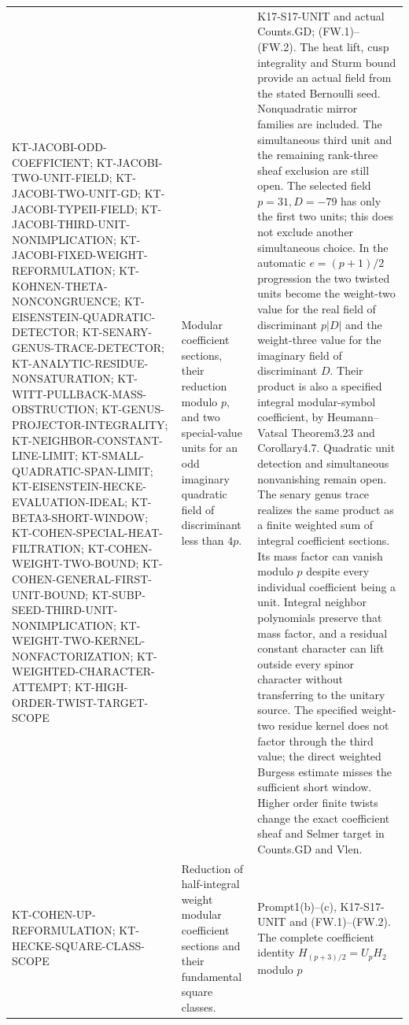\begin{longtable}{>{\raggedright\arraybackslash}p{}
>{\raggedright\arraybackslash}p{}
>{\raggedright\arraybackslash}p{}}
KT-JACOBI-ODD-COEFFICIENT;
KT-JACOBI-TWO-UNIT-FIELD;
KT-JACOBI-TWO-UNIT-GD; KT-JACOBI-TYPEII-FIELD;
KT-JACOBI-THIRD-UNIT-NONIMPLICATION;
KT-JACOBI-FIXED-WEIGHT-REFORMULATION;
KT-KOHNEN-THETA-NONCONGRUENCE;
KT-EISENSTEIN-QUADRATIC-DETECTOR;
KT-SENARY-GENUS-TRACE-DETECTOR;
KT-ANALYTIC-RESIDUE-NONSATURATION;
KT-WITT-PULLBACK-MASS-OBSTRUCTION;
KT-GENUS-PROJECTOR-INTEGRALITY;
KT-NEIGHBOR-CONSTANT-LINE-LIMIT;
KT-SMALL-QUADRATIC-SPAN-LIMIT;
KT-EISENSTEIN-HECKE-EVALUATION-IDEAL;
KT-BETA3-SHORT-WINDOW;
KT-COHEN-SPECIAL-HEAT-FILTRATION;
KT-COHEN-WEIGHT-TWO-BOUND;
KT-COHEN-GENERAL-FIRST-UNIT-BOUND;
KT-SUBP-SEED-THIRD-UNIT-NONIMPLICATION;
KT-WEIGHT-TWO-KERNEL-NONFACTORIZATION;
KT-WEIGHTED-CHARACTER-ATTEMPT;
KT-HIGH-ORDER-TWIST-TARGET-SCOPE &
Modular coefficient sections, their reduction modulo $p$,
and two special-value units for an odd imaginary quadratic
field of discriminant less than $4p$. &
K17-S17-UNIT and actual Counts.GD; (FW.1)--(FW.2).
The heat lift, cusp integrality and Sturm bound provide an
actual field from the stated Bernoulli seed. Nonquadratic
mirror families are included. The simultaneous third unit
and the remaining rank-three sheaf exclusion are still open.
The selected field $p=31,D=-79$ has only the first two units;
this does not exclude another simultaneous choice. In the
automatic $e=(p+1)/2$ progression the two twisted units become
the weight-two value for the real field of discriminant $p|D|$
and the weight-three value for the imaginary field of
discriminant $D$. Their product is also a specified integral modular-symbol coefficient,
by Heumann--Vatsal Theorem3.23 and Corollary4.7. Quadratic
unit detection and simultaneous nonvanishing remain open.
The senary genus trace realizes the same product as a finite
weighted sum of integral coefficient sections. Its mass factor
can vanish modulo $p$ despite every individual coefficient being
a unit. Integral neighbor polynomials preserve that mass factor,
and a residual constant character can lift outside every spinor
character without transferring to the unitary source. The specified
weight-two residue kernel does not factor through the third value;
the direct weighted Burgess estimate misses the sufficient short
window. Higher order finite twists change the exact coefficient
sheaf and Selmer target in Counts.GD and Vlen.\\
KT-COHEN-UP-REFORMULATION;
KT-HECKE-SQUARE-CLASS-SCOPE &
Reduction of half-integral weight modular coefficient sections
and their fundamental square classes. &
Prompt1(b)--(c), K17-S17-UNIT and (FW.1)--(FW.2).
The complete coefficient identity $H_{(p+3)/2}=U_pH_2$ modulo $p$

\end{longtable}

